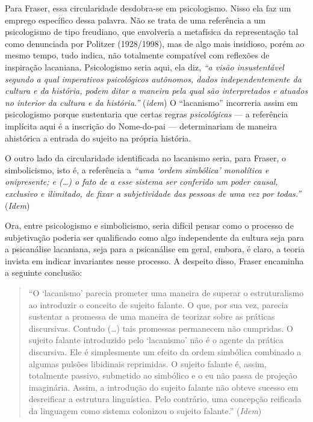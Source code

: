 Para Fraser, essa circularidade desdobra-se em psicologismo. Nisso ela
faz um emprego específico dessa palavra. Não se trata de uma referência
a um psicologismo de tipo freudiano, que envolveria a metafísica da
representação tal como denunciada por Politzer (1928/1998), mas de algo
mais insidioso, porém ao mesmo tempo, tudo indica, não totalmente
compatível com reflexões de inspiração lacaniana. Psicologismo seria
aqui, ela diz, \emph{``a visão insustentável segundo a qual imperativos
psicológicos autônomos, dados independentemente da cultura e da
história, podem ditar a maneira pela qual} \emph{são interpretados e
atuados no interior da cultura e da história.''} (\emph{idem}) O
``lacanismo'' incorreria assim em psicologismo porque sustentaria que
certas regras \emph{psicológicas} --- a referência implícita aqui é a
inscrição do Nome-do-pai --- determinariam de maneira ahistórica a
entrada do sujeito na própria história.

O outro lado da circularidade identificada no lacanismo seria, para
Fraser, o simbolicismo, isto é, a referência a \emph{``uma `ordem
simbólica' monolítica e onipresente; e (\ldots{}) o fato de a esse sistema
ser conferido um poder causal, exclusivo e ilimitado, de fixar a
subjetividade das pessoas de uma vez por todas.''} (\emph{Idem})

Ora, entre psicologismo e simbolicismo, seria difícil pensar como o
processo de subjetivação poderia ser qualificado como algo independente
da cultura seja para a psicanálise lacaniana, seja para a psicanálise em
geral, embora, é claro, a teoria invista em indicar invariantes nesse
processo. A despeito disso, Fraser encaminha a seguinte conclusão:

\begin{quote}
``O `lacanismo' parecia prometer uma maneira de superar o estruturalismo
ao introduzir o conceito de sujeito falante. O que, por sua vez, parecia
sustentar a promessa de uma maneira de teorizar sobre as práticas
discursivas. Contudo (\ldots{}) tais promessas permanecem não cumpridas. O
sujeito falante introduzido pelo `lacanismo' não é o agente da prática
discursiva. Ele é simplesmente um efeito da ordem simbólica combinado a
algumas pulsões libidinais reprimidas. O sujeito falante é, assim,
totalmente passivo, submetido ao simbólico e o eu não passa de projeção
imaginária. Assim, a introdução do sujeito falante não obteve sucesso em
desreificar a estrutura linguística. Pelo contrário, uma concepção
reificada da linguagem como sistema colonizou o sujeito falante.''
(\emph{Idem})
\end{quote}

